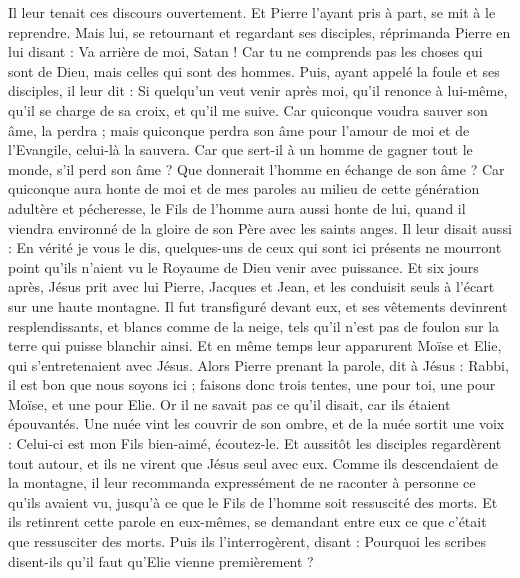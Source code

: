 \begin{multicols}{2}
Il leur tenait ces discours ouvertement. Et Pierre l'ayant pris à part, se mit à le reprendre.
Mais lui, se retournant et regardant ses disciples, réprimanda Pierre en lui disant : Va arrière de moi, Satan ! Car tu ne comprends pas les choses qui sont de Dieu, mais celles qui sont des hommes.
Puis, ayant appelé la foule et ses disciples, il leur dit : Si quelqu'un veut venir après moi, qu'il renonce à lui-même, qu'il se charge de sa croix, et qu'il me suive.
Car quiconque voudra sauver son âme, la perdra ; mais quiconque perdra son âme pour l'amour de moi et de l'Evangile, celui-là la sauvera.
Car que sert-il à un homme de gagner tout le monde, s'il perd son âme ?
Que donnerait l'homme en échange de son âme ?
Car quiconque aura honte de moi et de mes paroles au milieu de cette génération adultère et pécheresse, le Fils de l'homme aura aussi honte de lui, quand il viendra environné de la gloire de son Père avec les saints anges.
\VerseOne{}Il leur disait aussi : En vérité je vous le dis, quelques-uns de ceux qui sont ici présents ne mourront point qu'ils n'aient vu le Royaume de Dieu venir avec puissance.
Et six jours après, Jésus prit avec lui Pierre, Jacques et Jean, et les conduisit seuls à l'écart sur une haute montagne. Il fut transfiguré devant eux,
et ses vêtements devinrent resplendissants, et blancs comme de la neige, tels qu'il n'est pas de foulon sur la terre qui puisse blanchir ainsi.
Et en même temps leur apparurent Moïse et Elie, qui s'entretenaient avec Jésus.
Alors Pierre prenant la parole, dit à Jésus : Rabbi, il est bon que nous soyons ici ; faisons donc trois tentes, une pour toi, une pour Moïse, et une pour Elie.
Or il ne savait pas ce qu'il disait, car ils étaient épouvantés.
Une nuée vint les couvrir de son ombre, et de la nuée sortit une voix : Celui-ci est mon Fils bien-aimé, écoutez-le.
Et aussitôt les disciples regardèrent tout autour, et ils ne virent que Jésus seul avec eux.
Comme ils descendaient de la montagne, il leur recommanda expressément de ne raconter à personne ce qu'ils avaient vu, jusqu'à ce que le Fils de l'homme soit ressuscité des morts.
Et ils retinrent cette parole en eux-mêmes, se demandant entre eux ce que c'était que ressusciter des morts.
Puis ils l'interrogèrent, disant : Pourquoi les scribes disent-ils qu'il faut qu'Elie vienne premièrement ?

\end{multicols}
